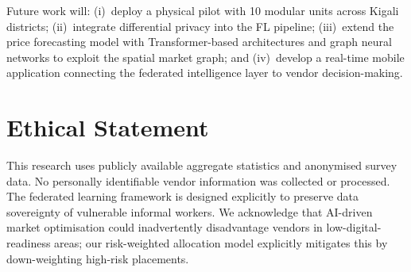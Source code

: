 \documentclass{article}
\begin{document}
Future work will: (i)~deploy a physical pilot with 10 modular units across Kigali districts; (ii)~integrate differential privacy \cite{wei2022dpfl} into the FL pipeline; (iii)~extend the price forecasting model with Transformer-based architectures \cite{zhou2021informer,wu2023timesnet} and graph neural networks \cite{wu2021graphsurvey} to exploit the spatial market graph; and (iv)~develop a real-time mobile application connecting the federated intelligence layer to vendor decision-making.

\section*{Ethical Statement}

This research uses publicly available aggregate statistics and anonymised survey data.
No personally identifiable vendor information was collected or processed.
The federated learning framework is designed explicitly to preserve data sovereignty of vulnerable informal workers.
We acknowledge that AI-driven market optimisation could inadvertently disadvantage vendors in low-digital-readiness areas; our risk-weighted allocation model explicitly mitigates this by down-weighting high-risk placements.



\end{document}
